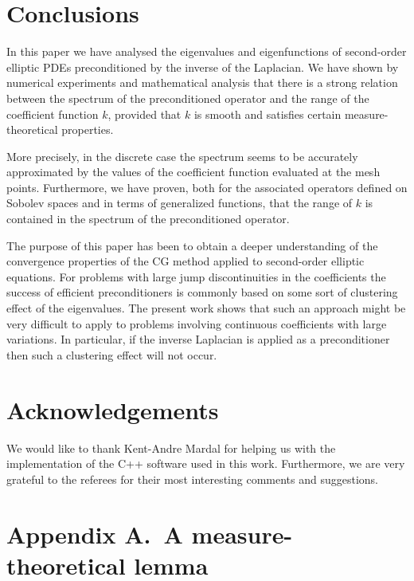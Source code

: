 \documentclass{imanum}
\begin{document}
\section{Conclusions}
\label{sec5}

In this paper we have analysed the eigenvalues and eigenfunctions of
second-order elliptic PDEs preconditioned by the inverse of the
Laplacian. We have shown by numerical experiments and mathematical
analysis that there is a strong relation between the spectrum of
the preconditioned operator and the range of the coefficient
function $k$, provided that $k$ is smooth and satisfies certain
measure-theoretical properties.

More precisely, in the discrete case the spectrum seems to be
accurately approximated by the values of the coefficient function
evaluated at the mesh points. Furthermore, we have proven, both
for the associated operators defined on Sobolev spaces and in terms
of generalized functions, that the range of $k$ is contained in
the spectrum of the preconditioned operator.

The purpose of this paper has been to obtain a deeper understanding
of the convergence properties of the CG method applied to
second-order elliptic equations. For problems with large jump
discontinuities in the coefficients the success of efficient
preconditioners is commonly based on some sort of clustering effect
of the eigenvalues. The present work shows that such an approach might
be very difficult to apply to problems involving continuous
coefficients with large variations. In particular, if the inverse
Laplacian is applied as a preconditioner then such a clustering effect
will not occur.


\section*{Acknowledgements}

We would like to thank Kent-Andre Mardal for helping us with the
implementation of the C++ software used in this work. Furthermore, we
are very grateful to the referees for their most interesting comments
and suggestions.





\clearpage

\appendix


\section*{Appendix A.\ A measure-theoretical lemma}
\label{app1}
\end{document}
